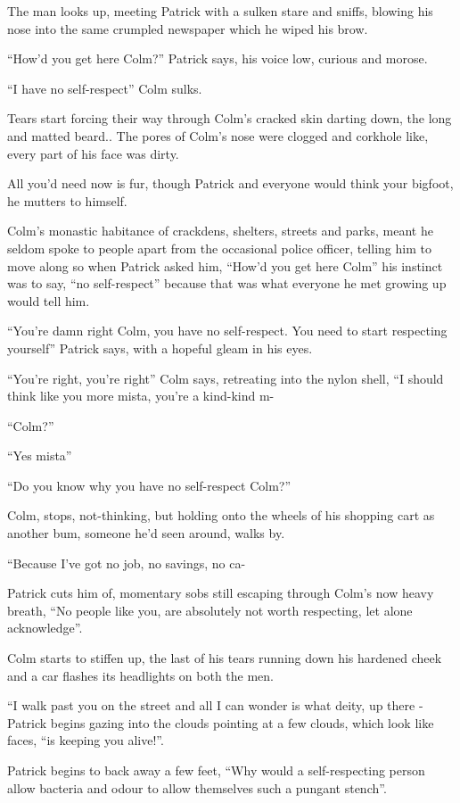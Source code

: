 \documentclass[19pt,openany]{book}
\begin{document}
The man looks up, meeting Patrick with a sulken stare and sniffs,
blowing his nose into the same crumpled newspaper which he
wiped his brow.

``How'd you get here Colm?'' Patrick says, his voice low, curious and morose.

``I have no self-respect'' Colm sulks.

Tears start forcing their way through Colm's cracked skin
darting down, the long and matted beard.. The pores of Colm's
nose were clogged and corkhole like, every part of his face was dirty.

All you'd need now is fur, though Patrick and everyone would think your bigfoot,
he mutters to himself.

Colm's monastic habitance of crackdens,
shelters, streets and parks, meant he seldom spoke
to people apart from the occasional police officer, telling him to move along
so when Patrick asked him, ``How'd you get here Colm'' his instinct was to
say, ``no self-respect'' because that was what everyone he met growing up would tell him.

``You're damn right Colm, you have no self-respect. You
need to start respecting yourself'' Patrick says, with a hopeful gleam in his eyes.

``You're right, you're right'' Colm says, retreating into
the nylon shell, ``I should think like you more mista, you're a kind-kind m-

``Colm?''

``Yes mista''

``Do you know why you have no self-respect Colm?''

Colm, stops, not-thinking, but holding onto the wheels of his shopping cart
as another bum, someone he'd seen around, walks by.

``Because I've got no job, no savings, no ca-

Patrick cuts him of, momentary sobs still escaping through
Colm's now heavy breath, ``No people like you, are absolutely
not worth respecting, let alone acknowledge''.

Colm starts to stiffen up, the last of his tears running down
his hardened cheek and a car flashes its headlights on both the men.

``I walk past you on the street and all I can wonder is what
deity, up there - Patrick begins gazing into the clouds pointing
at a few clouds, which look like faces, ``is keeping you alive!''.

Patrick begins to back away a few feet, ``Why would a self-respecting
person allow bacteria and odour to allow themselves such a pungant
stench''.
\end{document}
